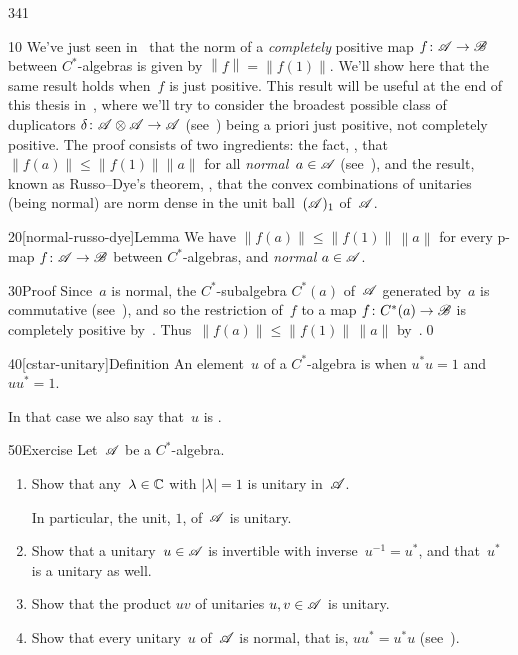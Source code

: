 \begin{parsec}{341}%
\begin{point}{10}%
We've just seen in~
that the norm of a \emph{completely} positive map 
    $f\colon \mathscr{A}\to\mathscr{B}$ between $C^*$-algebras
is given by $\left\|f\right\|=\left\|f(1)\right\|$.
We'll show here that the same result holds
when~$f$ is just positive.
This result will be useful at the end of this
thesis in~, where we'll
try to consider the broadest possible class
of duplicators
$\delta\colon \mathscr{A} \otimes \mathscr{A}\to\mathscr{A}$
    (see~)
being a priori just positive,
not completely positive.
The proof consists of two ingredients:
    the fact, ,
    that $\left\|f(a)\right\|\leq \|f(1)\| \|a\|$
    for all \emph{normal}~$a\in\mathscr{A}$ (see~),
and the result,
known as Russo--Dye's theorem,
,
that the convex combinations
of unitaries (being normal)
are norm dense in the unit ball~$(\mathscr{A})_1$
of~$\mathscr{A}$.
\end{point}
\begin{point}{20}[normal-russo-dye]{Lemma}%
We have $\left\|f(a)\right\| \leq \left\|f(1)\right\|\,\left\|a\right\|$
for every p-map $f\colon \mathscr{A}\to\mathscr{B}$ between $C^*$-algebras,
and \emph{normal} $a\in\mathscr{A}$.
    \begin{point}{30}{Proof}%
Since~$a$ is normal,
the $C^*$-subalgebra $C^*(a)$
of~$\mathscr{A}$ generated by~$a$
is commutative (see~),
and so the restriction of~$f$
to a map $f\colon C^*(a)\to\mathscr{B}$
is completely positive by~.
Thus~$\|f(a)\|\leq \|f(1)\|\,\|a\|$ by~.\qed
\end{point}
\end{point}
\begin{point}{40}[cstar-unitary]{Definition}%
An element~$u$ of a $C^*$-algebra
is 
when $u^*u=1$ and~$uu^*=1$.

    In that case we also say that~$u$ is .
\end{point}
\begin{point}{50}{Exercise}%
Let~$\mathscr{A}$ be a $C^*$-algebra.
\begin{enumerate}
\item
Show that any~$\lambda\in\mathbb{C}$ with $\left|\lambda\right|=1$
is unitary in~$\mathscr{A}$.

In particular, the unit, $1$, of~$\mathscr{A}$ is unitary.
\item
Show that a unitary~$u\in \mathscr{A}$ is invertible with inverse~$u^{-1}=u^*$,
and that~$u^*$ is a unitary as well.
\item
Show that the product $uv$ of unitaries $u,v\in\mathscr{A}$
is unitary.
\item
Show that every unitary~$u$ of~$\mathscr{A}$ is normal,
that is, $uu^*=u^*u$
(see~).


\end{enumerate}
\end{point}
\end{parsec}
